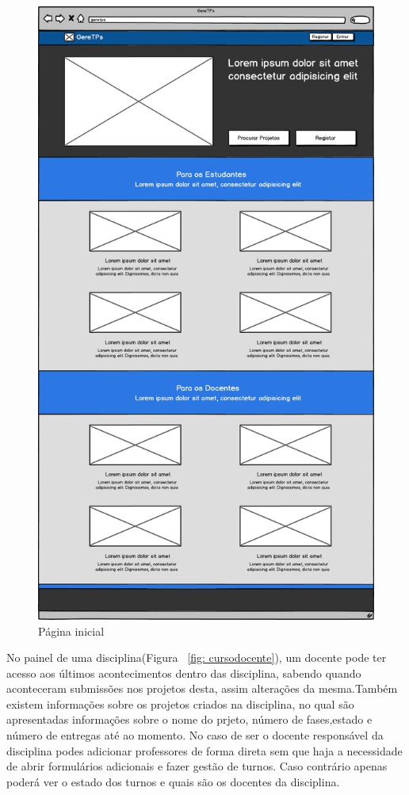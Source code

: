 \begin{figure}[htbp] 
        \centering
        \includegraphics[width=1\textwidth]{images/prototipos/mockups/home.png}
         \caption{Página inicial}
         \label{fig: home}
\end{figure}

No painel de uma disciplina(Figura ~\ref{fig: cursodocente}), um docente pode ter acesso aos últimos acontecimentos dentro das disciplina, sabendo quando aconteceram submissões nos projetos desta, assim alterações da mesma.Também existem informações sobre os projetos criados na disciplina, no qual são apresentadas informações sobre o nome do prjeto, número de fases,estado e número de entregas até ao momento. No caso de ser o docente responsável da disciplina podes adicionar professores de forma direta sem que haja a necessidade de abrir formulários adicionais e fazer gestão de turnos. Caso contrário apenas poderá ver o estado dos turnos e quais são os docentes da disciplina.\\

